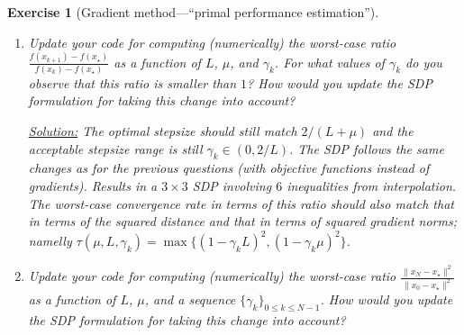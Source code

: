 \documentclass[11pt,a4paper]{article}
\newcommand{\inner}[2]{{\langle #1, #2\rangle}}
\newcommand{\correction}[1]{{{\color{blue}\underline{Solution:} #1}}}
\newcommand{\correction}[1]{}
\newtheorem{exercise}{Exercise}
\begin{document}
\begin{exercise}[Gradient method---``primal performance estimation'']
\begin{enumerate}
{\begin{equation*}
\begin{aligned}
		\text{s.t. } & \exists f\in\mathcal{F}_{\mu,L} \text{ such that }\left\{\begin{array}{ll}
			f_i=f(x_i)\quad & i=k,k+1\\
			g_i=\nabla f(x_i)\quad & i=k,k+1
			\end{array}\right.\\
		& x_{k+1}=x_k-\gamma_k  g_k\\
		& \|g_k\|^2=1,\\
		\end{aligned}
		\end{equation*}
		which can be encoded as a $2\times 2$ SDP using
			\begin{align*}
			G \triangleq \begin{bmatrix}
			\| g_k\|^2 & \inner{ g_{k+1}}{g_k}\\
			\inner{g_k}{g_{k+1}} & \|g_{k+1}\|^2
			\end{bmatrix},\quad 	F \triangleq 			f_{k+1}-f_k,
			\end{align*}
			and hence only $2$ inequalities arising from interpolation constraints.
	}
	
	\item Update your code for computing (numerically) the worst-case ratio $\frac{f(x_{k+1})-f(x_\star)}{f(x_{k})-f(x_\star)}$ as a function of $L$, $\mu$, and $\gamma_k$. For what values of $\gamma_k$ do you observe that this ratio is smaller than $1$? How would you update the SDP formulation for taking this change into account?
	
	\correction{The optimal stepsize should still match $2/(L+\mu)$ and the acceptable stepsize range is still $\gamma_k\in(0,2/L)$. The SDP follows the same changes as for the previous questions (with objective functions instead of gradients). Results in a $3\times 3$ SDP involving $6$ inequalities from interpolation. The worst-case convergence rate in terms of this ratio should also match that in terms of the squared distance and that in terms of squared gradient norms; namelly $\tau(\mu,L,\gamma_k)=\max\{(1-\gamma_k L)^2,(1-\gamma_k\mu)^2\}$.}
	
	\item Update your code for computing (numerically) the worst-case ratio $\frac{\|x_{N}-x_\star\|^2}{\|x_0-x_\star\|^2}$ as a function of $L$, $\mu$, and a sequence $\{\gamma_k\}_{0\leqslant k\leqslant N-1}$. How would you update the SDP formulation for taking this change into account?
	

\end{enumerate}
\end{exercise}
\end{document}
